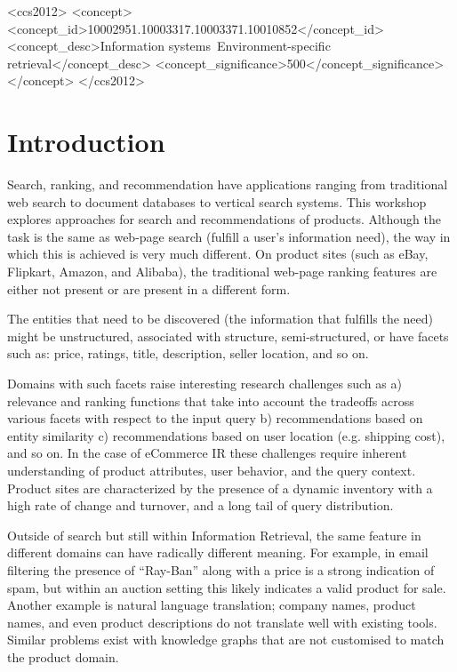 \documentclass[sigconf]{acmart}
\begin{document}
\begin{CCSXML}
<ccs2012>
<concept>
<concept_id>10002951.10003317.10003371.10010852</concept_id>
<concept_desc>Information systems~Environment-specific retrieval</concept_desc>
<concept_significance>500</concept_significance>
</concept>
</ccs2012>
\end{CCSXML}




\maketitle

\section{Introduction}

Search, ranking, and recommendation have applications ranging from
traditional web search to document databases to vertical search systems.
This workshop explores approaches for search and
recommendations of products.  Although the task is the same as web-page
search (fulfill a user's information need), the way in which this is
achieved is very much different.  On product sites (such as eBay, Flipkart,
Amazon, and Alibaba), the traditional web-page ranking features are either
not present or are present in a different form.

The entities that need to be discovered (the information that fulfills
the need) might be unstructured, associated
with structure, semi-structured, or have facets such as: price,
ratings, title, description, seller location, and so on. 

Domains with such facets raise interesting research challenges such as
a) relevance and ranking functions that take into account the tradeoffs
across various facets with respect to the input query b) recommendations
based on entity similarity c) recommendations based on user location
(e.g. shipping cost), and so on. In the case of eCommerce IR
these challenges require inherent
understanding of product attributes, user behavior, and the query
context. Product sites are characterized by the presence of a dynamic
inventory with a high rate of change and turnover, and a long tail of
query distribution.

Outside of search but still within Information Retrieval, the same
feature in different domains can have radically different meaning.  For
example, in email filtering the presence of ``Ray-Ban''  along with a
price is a strong indication of spam, but within an auction setting
this likely indicates a valid product for sale.  Another example is
natural language translation; company names, product names, and even
product descriptions do not translate well with existing tools.  Similar
problems exist with knowledge graphs that are not customised to match
the product domain.
\end{document}
